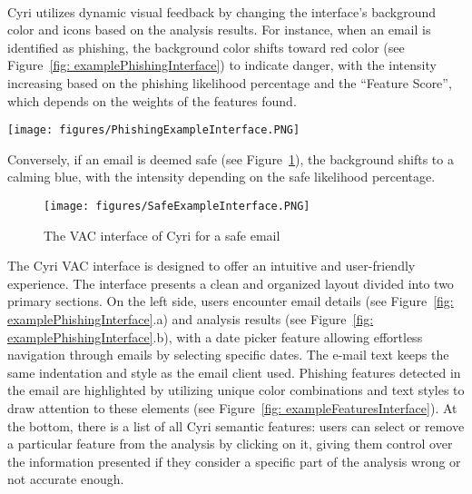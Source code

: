 \\
Cyri utilizes dynamic visual feedback by changing the interface's background color and icons based on the analysis results. For instance, when an email is identified as phishing, the background color shifts toward red color (see Figure~\ref{fig: examplePhishingInterface}) to indicate danger, with the intensity increasing based on the phishing likelihood percentage and the ``Feature Score'', which depends on the weights of the features found.

\begin{figure*}[htbp]
  \centering
  \texttt{[image: figures/PhishingExampleInterface.PNG]}
  \caption{The VAC interface of Cyri in action: red background identifies a phishing mail, with semantic features highlighted in the email text (a) and the list below (b). Conversation with LISA happens on the right (c) through the query interface (d) or by audio (e)}
  \label{fig: examplePhishingInterface}
\end{figure*}

Conversely, if an email is deemed safe (see Figure~\ref{fig: exampleSafeInterface}), the background shifts to a calming blue, with the intensity depending on the safe likelihood percentage.

\begin{figure}[htbp]
  \centering
  \texttt{[image: figures/SafeExampleInterface.PNG]}
  \caption{The VAC interface of Cyri for a safe email}
  \label{fig: exampleSafeInterface}
\end{figure}

The Cyri VAC interface is designed to offer an intuitive and user-friendly experience. The interface presents a clean and organized layout divided into two primary sections. On the left side, users encounter email details (see Figure~\ref{fig: examplePhishingInterface}.a) and analysis results (see Figure~\ref{fig: examplePhishingInterface}.b), with a date picker feature allowing effortless navigation through emails by selecting specific dates. The e-mail text keeps the same indentation and style as the email client used. Phishing features detected in the email are highlighted by utilizing unique color combinations and text styles to draw attention to these elements (see Figure~\ref{fig: exampleFeaturesInterface}).
At the bottom, there is a list of all Cyri semantic features: users can select or remove a particular feature from the analysis by clicking on it, giving them control over the information presented if they consider a specific part of the analysis wrong or not accurate enough. 

